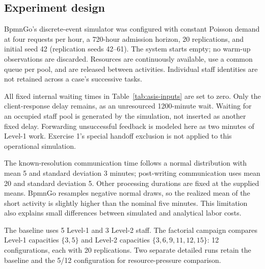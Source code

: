 \documentclass[10pt,a4paper]{article}
\begin{document}
\subsection{Experiment design}
BpmnGo's discrete-event simulator was configured with constant Poisson demand at
four requests per hour, a 720-hour admission horizon, 20 replications, and initial
seed 42 (replication seeds 42--61). The system starts empty; no warm-up observations
are discarded. Resources are continuously available, use a common queue per pool,
and are released between activities. Individual staff identities are not retained
across a case's successive tasks.

All fixed internal waiting times in Table~\ref{tab:asis-inputs} are set to zero.
Only the client-response delay remains, as an unresourced 1200-minute wait.
Waiting for an occupied staff pool is generated by the simulation, not inserted
as another fixed delay. Forwarding unsuccessful feedback is modeled here as two
minutes of Level-1 work. Exercise 1's special handoff exclusion is not applied to
this operational simulation.

The known-resolution communication time follows a normal distribution with mean
5 and standard deviation 3 minutes; post-writing communication uses mean 20 and
standard deviation 5. Other processing durations are fixed at the supplied means.
BpmnGo resamples negative normal draws, so the realized mean of the short activity
is slightly higher than the nominal five minutes. This limitation also explains
small differences between simulated and analytical labor costs.

The baseline uses 5 Level-1 and 3 Level-2 staff. The factorial campaign compares
Level-1 capacities $\{3,5\}$ and Level-2 capacities $\{3,6,9,11,12,15\}$: 12
configurations, each with 20 replications. Two separate detailed runs retain the
baseline and the 5/12 configuration for resource-pressure comparison.
\end{document}
